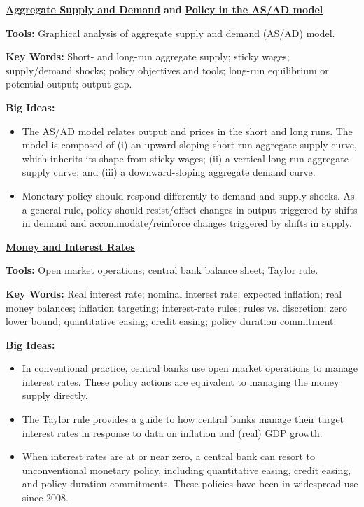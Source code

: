 \hyperref[chp:asad]{\textbf{\underline{Aggregate Supply and Demand}}} \textbf{and} \hyperref[chp:pasad]{\textbf{\underline{Policy in the AS/AD model}}}

\textbf{Tools:} Graphical analysis of aggregate supply and demand (AS/AD) model.

\textbf{Key Words:} Short- and long-run aggregate supply; sticky wages; supply/demand shocks; policy objectives and tools; long-run equilibrium or potential output; output gap.

\textbf{Big Ideas:}
\vspace{-0.1in}
\begin{itemize}
\item The AS/AD model relates output and prices in the short and long runs.
The model is composed of (i) an upward-sloping short-run aggregate supply curve,
which inherits its shape from sticky wages;
(ii) a vertical long-run aggregate supply curve;
and (iii) a downward-sloping aggregate demand curve.
\item Monetary policy should respond
differently to demand and supply shocks.
As a general rule, policy should resist/offset changes in output triggered by shifts in demand
and accommodate/reinforce changes triggered by shifts in supply.
\end{itemize}


\hyperref[chp:mpir]{\textbf{\underline{Money and Interest Rates}}}

\textbf{Tools:} Open market operations; central bank balance sheet; Taylor rule.

\textbf{Key Words:} Real interest rate; nominal interest rate; expected inflation; real money balances; inflation targeting; interest-rate rules; rules vs. discretion; zero lower bound; quantitative easing; credit easing; policy duration commitment.

\textbf{Big Ideas:}
\vspace{-0.1in}
\begin{itemize}
\item In conventional practice, central banks use open market operations
to manage interest rates.
These policy actions are equivalent to managing the money supply directly.
\item The Taylor rule provides a guide to how central banks manage their target interest rates
in response to data on inflation and (real) GDP growth.
\item When interest rates are at or near zero, a central bank can resort to unconventional monetary policy,
 including quantitative easing, credit easing, and policy-duration commitments.
 These policies have been in widespread use since 2008.
\end{itemize}
